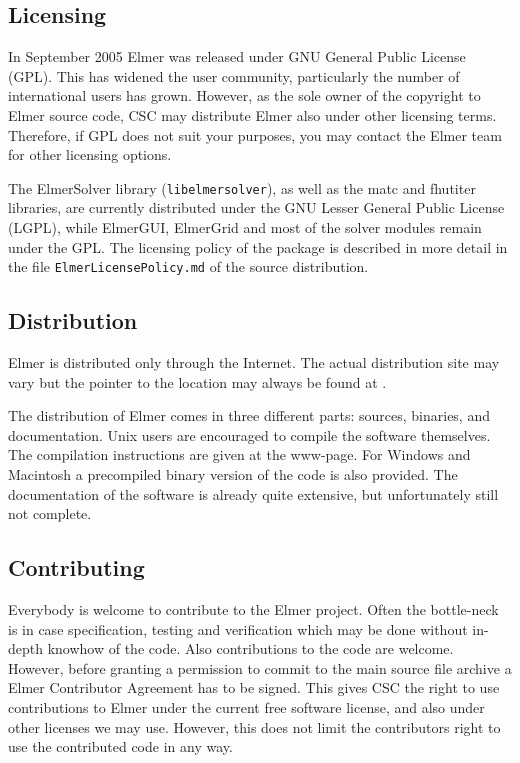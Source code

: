 \subsection*{Licensing}
In September 2005 Elmer was released under GNU General Public License (GPL). This 
has widened the user community, particularly the number of international users has grown.
However, as the sole owner of the copyright to Elmer source code, CSC may distribute 
Elmer also under other licensing terms. Therefore, if GPL does not suit your purposes, 
you may contact the Elmer team for other licensing options. 

The ElmerSolver library (\texttt{libelmersolver}), as well as the matc and fhutiter
libraries, are currently distributed under the GNU Lesser General Public License (LGPL),
while ElmerGUI, ElmerGrid and most of the solver modules remain under the GPL. The
licensing policy of the package is described in more detail in the file
\texttt{ElmerLicensePolicy.md} of the source distribution.

\subsection*{Distribution}
Elmer is distributed only through the Internet. The actual distribution site may vary 
but the pointer to the location may always be found at . 

The distribution of Elmer comes in three different parts: sources, binaries, and documentation.
Unix users are encouraged to 
compile the software themselves. The compilation instructions are given at the www-page.
For Windows and Macintosh a precompiled binary version of the code is also provided. 
The documentation of the software is already quite extensive, but unfortunately still not complete.

\subsection*{Contributing}
Everybody is welcome to contribute to the Elmer project. 
Often the bottle-neck is in case specification, testing and verification which may be done 
without in-depth knowhow of the code. Also contributions to the code are welcome. However, before 
granting a permission to commit to the main source file archive a Elmer Contributor Agreement 
has to be signed. This gives CSC the right to use contributions to Elmer under the current free software license, 
and also under other licenses we may use. However, this does not limit the contributors right to use the contributed code
in any way. 


